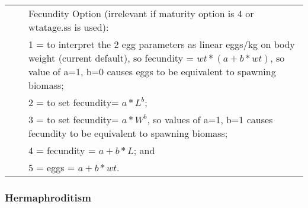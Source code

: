 \begin{longtable}{p{0.5cm} p{2cm} p{13cm}}
	\Tstrut 1 & & Fecundity Option (irrelevant if maturity option is 4 or wtatage.ss is used):\\
	  & & 1 = to  interpret the 2 egg parameters as linear eggs/kg on body weight (current default),  so fecundity = $wt * (a+b*wt)$,  so value of a=1, b=0 causes eggs to be equivalent to spawning biomass;\\
	  & & 2 = to set fecundity= $a*L^ b$;\\
	  & & 3 = to set fecundity= $a*W^ b$, so values of a=1, b=1 causes fecundity to be equivalent to spawning biomass;\\
	  & & 4 = fecundity = $a+b*L$; and \\
	  & & 5 = eggs = $a+b*wt$.\Bstrut\\
	\hline
\end{longtable}

\pagebreak

\subsubsection{Hermaphroditism}

